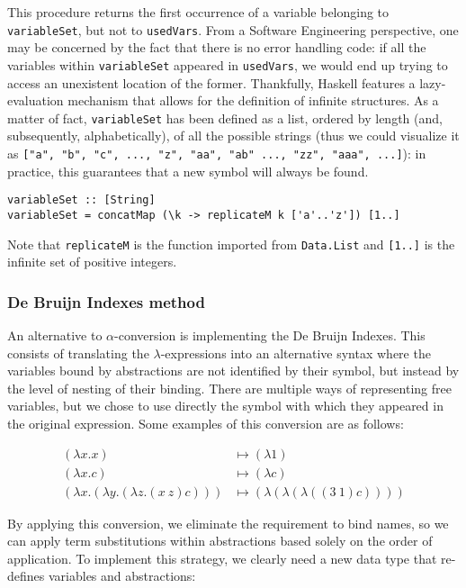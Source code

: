 \documentclass{article}
\begin{document}
This procedure returns the first occurrence of a variable belonging to \lstinline|variableSet|, but not to \lstinline|usedVars|. From a Software Engineering perspective, one may be concerned by the fact that there is no error handling code: if all the variables within \lstinline|variableSet| appeared in \lstinline|usedVars|, we would end up trying to access an unexistent location of the former. Thankfully, Haskell features a lazy-evaluation mechanism that allows for the definition of infinite structures. As a matter of fact, \lstinline|variableSet| has been defined as a list, ordered by length (and, subsequently, alphabetically), of all the possible strings (thus we could visualize it as \lstinline|["a", "b", "c", ..., "z", "aa", "ab" ..., "zz", "aaa", ...]|): in practice, this guarantees that a new symbol will always be found.

\begin{lstlisting}
variableSet :: [String]
variableSet = concatMap (\k -> replicateM k ['a'..'z']) [1..]
\end{lstlisting}

Note that \lstinline|replicateM| is the function imported from \lstinline|Data.List| and \lstinline|[1..]| is the infinite set of positive integers.

\subsubsection{De Bruijn Indexes method}

An alternative to $\alpha$-conversion is implementing the De Bruijn Indexes. This consists of translating the $\lambda$-expressions into an alternative syntax where the variables bound by abstractions are not identified by their symbol, but instead by the level of nesting of their binding. There are multiple ways of representing free variables, but we chose to use directly the symbol with which they appeared in the original expression. Some examples of this conversion are as follows:

\begin{align*}
(\lambda x . x) &\mapsto (\lambda 1)\\
(\lambda x . c) &\mapsto (\lambda c)\\
(\lambda x . (\lambda y . (\lambda z . (x\ z) c))) &\mapsto (\lambda(\lambda(\lambda ((3\ 1) c))))
\end{align*}

By applying this conversion, we eliminate the requirement to bind names, so we can apply term substitutions within abstractions based solely on the order of application. To implement this strategy, we clearly need a new data type that re-defines variables and abstractions:
\end{document}
